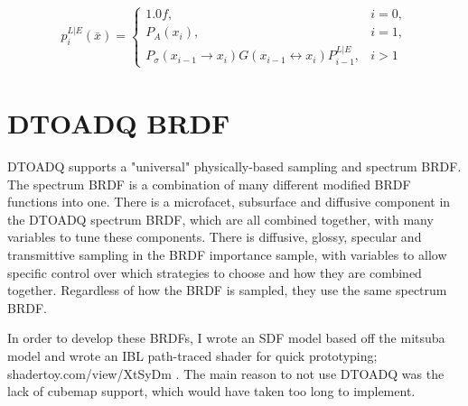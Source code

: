 \documentclass{article}
\begin{document}
  \begin{align}
    p^{L|E}_i(\bar{x}) =
    \begin{cases}
      1.0f, & i = 0,\\
      P_A(x_i), & i = 1,\\
      P_{\sigma}(x_{i-1} \rightarrow x_i) G(x_{i-1} \leftrightarrow x_i)
      P^{L|E}_{i-1}, & i > 1
    \end{cases}
  \end{align}


  \section{DTOADQ BRDF}
  DTOADQ supports a "universal" physically-based sampling and spectrum BRDF. The
spectrum BRDF is a combination of many different modified BRDF functions into
one. There is a microfacet, subsurface and diffusive component in the DTOADQ
spectrum BRDF, which are all combined together, with many variables to tune
these components. There is diffusive, glossy, specular and transmittive sampling
in the BRDF importance sample, with variables to allow specific control over
which strategies to choose and how they are combined together. Regardless of how
the BRDF is sampled, they use the same spectrum BRDF.
  
  In order to develop these BRDFs, I wrote an SDF model based off the mitsuba
model and wrote an IBL path-traced shader for quick prototyping;
shadertoy.com/view/XtSyDm . The main reason to not use DTOADQ was the lack of
cubemap support, which would have taken too long to implement.
  
\end{document}
